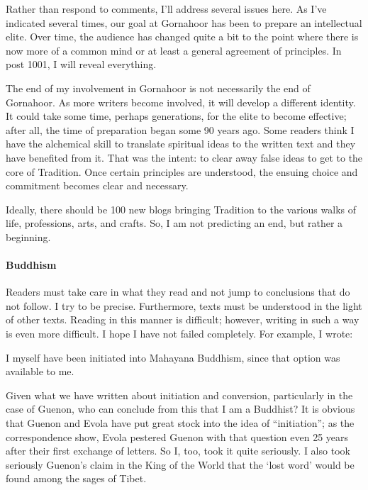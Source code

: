 Rather than respond to comments, I'll address several issues here. As I've indicated several times, our goal at Gornahoor has been to prepare an intellectual elite. Over time, the audience has changed quite a bit to the point where there is now more of a common mind or at least a general agreement of principles. In post 1001, I will reveal everything.

The end of my involvement in Gornahoor is not necessarily the end of Gornahoor. As more writers become involved, it will develop a different identity. It could take some time, perhaps generations, for the elite to become effective; after all, the time of preparation began some 90 years ago. Some readers think I have the alchemical skill to translate spiritual ideas to the written text and they have benefited from it. That was the intent: to clear away false ideas to get to the core of Tradition. Once certain principles are understood, the ensuing choice and commitment becomes clear and necessary.

Ideally, there should be 100 new blogs bringing Tradition to the various walks of life, professions, arts, and crafts. So, I am not predicting an end, but rather a beginning.

\paragraph{Buddhism}


Readers must take care in what they read and not jump to conclusions that do not follow. I try to be precise. Furthermore, texts must be understood in the light of other texts. Reading in this manner is difficult; however, writing in such a way is even more difficult. I hope I have not failed completely. For example, I wrote:

\begin{quotex}
I myself have been initiated into Mahayana Buddhism, since that option was available to me.
\end{quotex}


Given what we have written about initiation and conversion, particularly in the case of Guenon, who can conclude from this that I am a Buddhist? It is obvious that Guenon and Evola have put great stock into the idea of ``initiation''; as the correspondence show, Evola pestered Guenon with that question even 25 years after their first exchange of letters. So I, too, took it quite seriously. I also took seriously Guenon's claim in the King of the World that the `lost word' would be found among the sages of Tibet.


